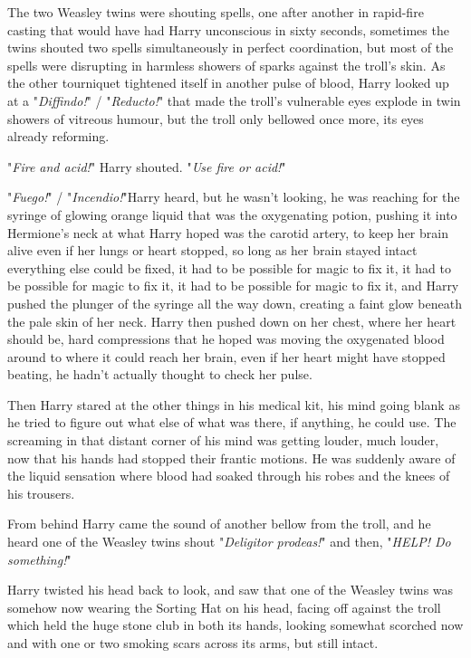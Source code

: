 The two Weasley twins were shouting spells, one after another in rapid-fire
casting that would have had Harry unconscious in sixty seconds, sometimes the
twins shouted two spells simultaneously in perfect coordination, but most of
the spells were disrupting in harmless showers of sparks against the troll's
skin. As the other tourniquet tightened itself in another pulse of blood, Harry
looked up at a "\emph{Diffindo!}" / "\emph{Reducto!}" that made the troll's vulnerable
eyes explode in twin showers of vitreous humour, but the troll only bellowed
once more, its eyes already reforming.

"\emph{Fire and acid!}" Harry shouted. "\emph{Use fire or acid!}"

"\emph{Fuego!}" / "\emph{Incendio!}"Harry heard, but he wasn't looking, he was
reaching for the syringe of glowing orange liquid that was the oxygenating
potion, pushing it into Hermione's neck at what Harry hoped was the carotid
artery, to keep her brain alive even if her lungs or heart stopped, so long as
her brain stayed intact everything else could be fixed, it had to be possible
for magic to fix it, it had to be possible for magic to fix it, it had to be
possible for magic to fix it, and Harry pushed the plunger of the syringe all
the way down, creating a faint glow beneath the pale skin of her neck. Harry
then pushed down on her chest, where her heart should be, hard compressions
that he hoped was moving the oxygenated blood around to where it could reach
her brain, even if her heart might have stopped beating, he hadn't actually
thought to check her pulse.

Then Harry stared at the other things in his medical kit, his mind going blank
as he tried to figure out what else of what was there, if anything, he could
use. The screaming in that distant corner of his mind was getting louder, much
louder, now that his hands had stopped their frantic motions. He was suddenly
aware of the liquid sensation where blood had soaked through his robes and the
knees of his trousers.

From behind Harry came the sound of another bellow from the troll, and he heard
one of the Weasley twins shout "\emph{Deligitor prodeas!}" and then,
"\emph{HELP! Do something!}"

Harry twisted his head back to look, and saw that one of the Weasley twins was
somehow now wearing the Sorting Hat on his head, facing off against the troll
which held the huge stone club in both its hands, looking somewhat scorched now
and with one or two smoking scars across its arms, but still intact.

